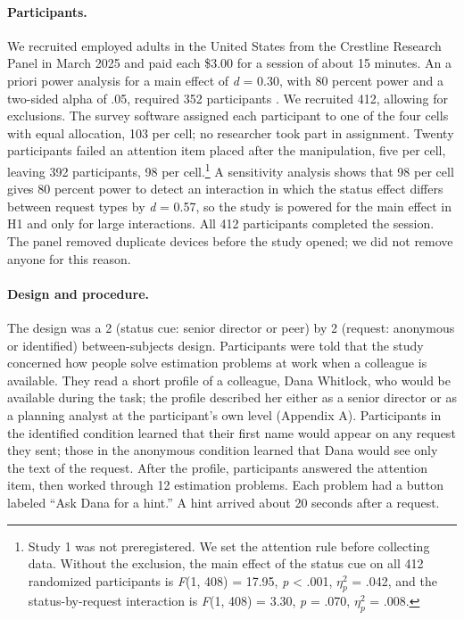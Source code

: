 \documentclass[11pt]{article}
\newcommand{\etap}{\ensuremath{\eta^2_p}}
\begin{document}
\paragraph{Participants.} We recruited employed adults in the United States from the Crestline Research Panel in March 2025 and paid each \$3.00 for a session of about 15 minutes. An a priori power analysis for a main effect of \textit{d} = 0.30, with 80 percent power and a two-sided alpha of .05, required 352 participants \citep{lakens2022}. We recruited 412, allowing for exclusions. The survey software assigned each participant to one of the four cells with equal allocation, 103 per cell; no researcher took part in assignment. Twenty participants failed an attention item placed after the manipulation, five per cell, leaving 392 participants, 98 per cell.\footnote{Study 1 was not preregistered. We set the attention rule before collecting data. Without the exclusion, the main effect of the status cue on all 412 randomized participants is {\itshape F}(1, 408) = 17.95, \textit{p} < .001, \etap{} = .042, and the status-by-request interaction is {\itshape F}(1, 408) = 3.30, \textit{p} = .070, \etap{} = .008.} A sensitivity analysis shows that 98 per cell gives 80 percent power to detect an interaction in which the status effect differs between request types by \textit{d} = 0.57, so the study is powered for the main effect in H1 and only for large interactions. All 412 participants completed the session. The panel removed duplicate devices before the study opened; we did not remove anyone for this reason.

\paragraph{Design and procedure.} The design was a 2 (status cue: senior director or peer) by 2 (request: anonymous or identified) between-subjects design. Participants were told that the study concerned how people solve estimation problems at work when a colleague is available. They read a short profile of a colleague, Dana Whitlock, who would be available during the task; the profile described her either as a senior director or as a planning analyst at the participant's own level (Appendix A). Participants in the identified condition learned that their first name would appear on any request they sent; those in the anonymous condition learned that Dana would see only the text of the request. After the profile, participants answered the attention item, then worked through 12 estimation problems. Each problem had a button labeled ``Ask Dana for a hint.'' A hint arrived about 20 seconds after a request.
\end{document}

